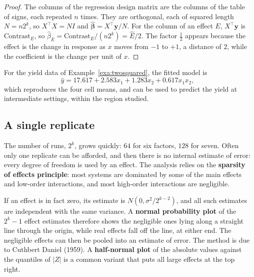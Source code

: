 \documentclass[11pt,a4paper]{article}
\numberwithin{equation}{section}
\theoremstyle{definition}
\begin{document}
\begin{proof}
The columns of the regression design matrix are the columns of the table of signs, each repeated $n$ times. They are orthogonal, each of squared
length $N = n2^k$, so $X^\top X = NI$ and $\hat{\boldsymbol\beta} = X^\top\mathbf y/N$. For the column of an effect $E$, $X^\top\mathbf y$ is $\text{Contrast}_E$, so $\hat\beta_E = \text{Contrast}_E/(n2^k) = \hat E/2$. The factor $\frac12$
appears because the effect is the change in response as $x$ moves from $-1$ to $+1$, a distance of $2$, while the coefficient is the change per unit of $x$.
\end{proof}

For the yield data of Example~\ref{exa:twosquared}, the fitted model is
\[
\hat y = 17.617 + 2.583x_1 + 1.283x_2 + 0.617x_1x_2 ,
\]
which reproduces the four cell means, and can be used to predict the yield at intermediate settings, within the region studied.

\subsection{A single replicate}
The number of runs, $2^k$, grows quickly: $64$ for six factors, $128$ for seven. Often only one replicate can be afforded, and then there is no internal
estimate of error: every degree of freedom is used by an effect. The analysis relies on the \textbf{sparsity of effects principle}: most systems are
dominated by some of the main effects and low-order interactions, and most high-order interactions are negligible.

If an effect is in fact zero, its estimate is $N(0, \sigma^2/2^{k-2})$, and all such estimates are independent with the same variance. A \textbf{normal probability
plot} of the $2^k - 1$ effect estimates therefore shows the negligible ones lying along a straight line through the origin, while real effects fall off the
line, at either end. The negligible effects can then be pooled into an estimate of error. The method is due to Cuthbert Daniel (1959). A
\textbf{half-normal plot} of the absolute values against the quantiles of $|Z|$ is a common variant that puts all large effects at the top right.
\end{document}
